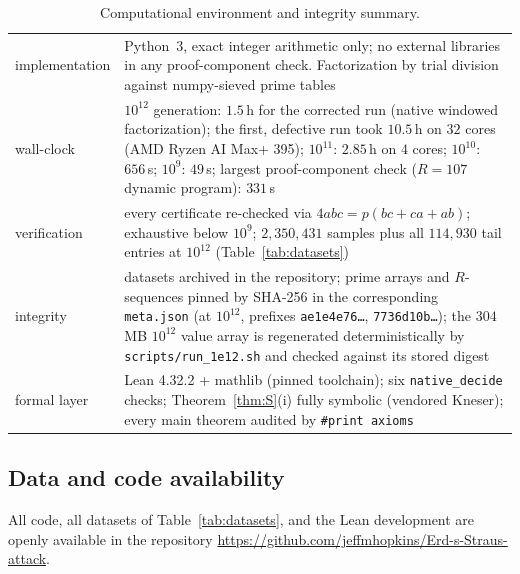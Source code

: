 \documentclass[11pt]{article}
\theoremstyle{plain}
\theoremstyle{remark}
\theoremstyle{plain}
\numberwithin{equation}{section}
\begin{document}
\begin{table}[htbp]
\centering
\small
\begin{tabular}{>{\raggedright\arraybackslash}p{3.0cm}>{\raggedright\arraybackslash}p{9.8cm}}
\toprule
implementation & Python~3, exact integer arithmetic only; no external
libraries in any proof-component check. Factorization by trial
division against numpy-sieved prime tables \\ \addlinespace
wall-clock & $10^{12}$ generation: $1.5$\,h for the corrected run
(native windowed factorization); the first, defective run took
$10.5$\,h on $32$ cores (AMD Ryzen AI Max+ 395); $10^{11}$:
$2.85$\,h on $4$ cores; $10^{10}$: $656$\,s; $10^9$: $49$\,s; largest
proof-component check ($R = 107$ dynamic program): $331$\,s \\ \addlinespace
verification & every certificate re-checked via
$4abc = p(bc{+}ca{+}ab)$; exhaustive below $10^9$; $2{,}350{,}431$
samples plus all $114{,}930$ tail entries at $10^{12}$
(Table~\ref{tab:datasets}) \\ \addlinespace
integrity & datasets archived in the repository; prime arrays and
$R$-sequences pinned by SHA-256 in the corresponding
\texttt{meta.json} (at $10^{12}$, prefixes \texttt{ae1e4e76\ldots},
\texttt{7736d10b\ldots}); the $304$\,MB $10^{12}$ value array is
regenerated deterministically by \texttt{scripts/run\_1e12.sh} and
checked against its stored digest \\ \addlinespace
formal layer & Lean 4.32.2 + mathlib (pinned toolchain); six
\texttt{native\_decide} checks; Theorem~\ref{thm:S}(i) fully
symbolic (vendored Kneser); every main theorem audited by
\texttt{\#print axioms} \\
\bottomrule
\end{tabular}
\caption{Computational environment and integrity summary.}
\label{tab:env}
\end{table}

\subsection*{Data and code availability}

All code, all datasets of Table~\ref{tab:datasets}, and the Lean
development are openly available in the repository
\url{https://github.com/jeffmhopkins/Erd-s-Straus-attack}.
\end{document}
